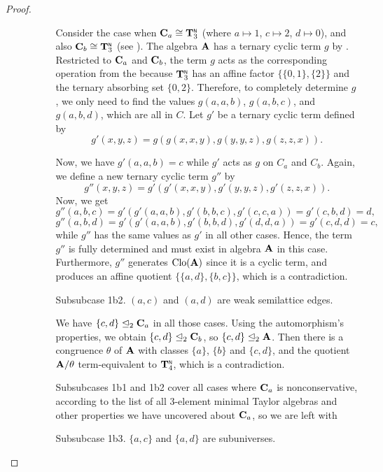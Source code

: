 \documentclass[11pt]{amsart}
\newcommand{\m}[1]{\mathbf{\uppercase{#1}}}
\newcommand{\n}{\scriptscriptstyle{\mathsf{N}}}
\theoremstyle{definition}
\theoremstyle{remark}
\theoremstyle{plain}
\begin{document}
\begin{proof}
\begin{enumerate}[wide, labelwidth=!,itemindent=!,labelindent=0pt]
\begin{enumerate}[wide, labelindent=0pt]
\begin{enumerate}[wide, labelwidth=!,labelindent=0pt,itemindent=!]
Consider the case when ${\m C}_a\cong {\m T}_3^{\n}$ (where $a\mapsto 1$, $c\mapsto 2$, $d\mapsto 0$), and also ${\m C}_b\cong {\m T}_3^{\n}$ (see ). The algebra ${\m A}$ has a ternary cyclic term $g$ by . Restricted to ${\m C}_a$ and ${\m C}_b$, the term $g$ acts as the corresponding operation from the  because ${\m T}_3^{\n}$ has an affine factor $\{\{0,1\},\{2\}\}$ and the ternary absorbing set $\{0,2\}$. Therefore, to completely determine $g$, we only need to find the values $g(a,a,b)$, $g(a,b,c)$, and $g(a,b,d)$, which are all in $C$.
Let $g'$ be a ternary cyclic term defined by $$g'(x,y,z) = g(g(x,x,y),g(y,y,z),g(z,z,x)).$$

\noindent Now, we have $g'(a,a,b)=c$ while $g'$ acts as $g$ on $C_a$ and $C_b$. Again, we define a new ternary cyclic term $g''$ by 
$$g''(x,y,z) = g'(g'(x,x,y),g'(y,y,z),g'(z,z,x)).$$
\noindent Now, we get
$$g''(a,b,c)=g'(g'(a,a,b),g'(b,b,c),g'(c,c,a))=g'(c,b,d)=d,$$
$$g''(a,b,d)=g'(g'(a,a,b),g'(b,b,d),g'(d,d,a))=g'(c,d,d)=c,$$
while $g''$ has the same values as $g'$ in all other cases. Hence, the term $g''$ is fully determined and must exist in algebra ${\m A}$ in this case. Furthermore, $g''$ generates $\mathrm{Clo}({\m A})$ since it is a cyclic term, and produces an affine quotient $\{\{a,d\},\{b,c\}\}$, which is a contradiction.

    \item[{\sc Subsubcase 1b2}.] $(a,c)$ and $(a,d)$ are weak semilattice edges.
    
    We have $\{c,d\}\trianglelefteq_2 \m c_a$ in all those cases. Using the automorphism's properties, we obtain $\{c,d\}\trianglelefteq_2\m c_b$, so $\{c,d\}\trianglelefteq_2\m a$. Then there is a congruence $\theta$ of $\m a$ with classes $\{a\}$, $\{b\}$ and $\{c,d\}$, and the quotient $\m a/\theta$ term-equivalent to $\m t_4^{\n}$, which is a contradiction.

{\sc Subsubcases 1b1} and {\sc 1b2} cover all cases where $\m c_a$ is nonconservative, according to the list of all 3-element minimal Taylor algebras and other properties we have uncovered about $\m c_a$, so we are left with

    \item[{\sc Subsubcase 1b3}.] $\{a,c\}$ and $\{a,d\}$ are subuniverses.


\end{enumerate}
\end{enumerate}
\end{enumerate}
\end{proof}
\end{document}
